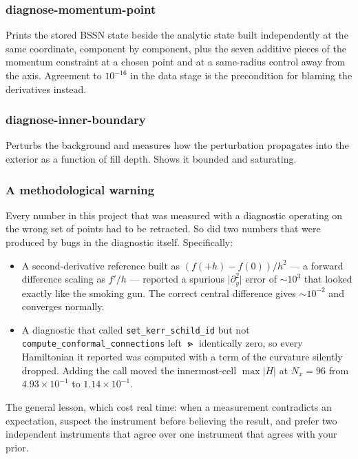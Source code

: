 \subsubsection{diagnose-momentum-point}

Prints the stored BSSN state beside the analytic state built independently at
the same coordinate, component by component, plus the seven additive pieces of
the momentum constraint at a chosen point and at a same-radius control away
from the axis. Agreement to $10^{-16}$ in the data stage is the precondition
for blaming the derivatives instead.

\subsubsection{diagnose-inner-boundary}

Perturbs the background and measures how the perturbation propagates into the
exterior as a function of fill depth. Shows it bounded and saturating.

\subsubsection{A methodological warning}

\gotcha
Every number in this project that was measured with a diagnostic operating on
the wrong set of points had to be retracted. So did two numbers that were
produced by bugs in the diagnostic itself. Specifically:
\begin{itemize}
\item A second-derivative reference built as $(f(+h) - f(0))/h^2$ --- a forward
      difference scaling as $f'/h$ --- reported a spurious
      $\lvert \partial_y^2\rvert$ error of $\sim 10^{3}$ that looked exactly
      like the smoking gun. The correct central difference gives $\sim10^{-2}$
      and converges normally.
\item A diagnostic that called \texttt{set\_kerr\_schild\_id} but not
      \texttt{compute\_conformal\_connections} left $\Gt$ identically zero, so
      every Hamiltonian it reported was computed with a term of the curvature
      silently dropped. Adding the call moved the innermost-cell $\max|H|$ at
      $N_x = 96$ from $4.93\times10^{-1}$ to $1.14\times10^{-1}$.
\end{itemize}

The general lesson, which cost real time: when a measurement contradicts an
expectation, suspect the instrument before believing the result, and prefer
two independent instruments that agree over one instrument that agrees with
your prior.


